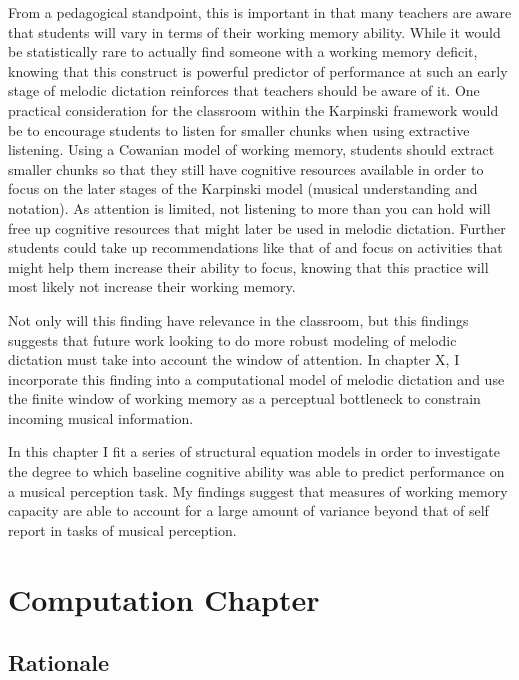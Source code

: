 \documentclass[]{book}
\begin{document}
From a pedagogical standpoint, this is important in that many teachers are aware that students will vary in terms of their working memory ability.
While it would be statistically rare to actually find someone with a working memory deficit, knowing that this construct is powerful predictor of performance at such an early stage of melodic dictation reinforces that teachers should be aware of it.
One practical consideration for the classroom within the Karpinski framework would be to encourage students to listen for smaller chunks when using extractive listening.
Using a Cowanian model of working memory, students should extract smaller chunks so that they still have cognitive resources available in order to focus on the later stages of the Karpinski model (musical understanding and notation).
As attention is limited, not listening to more than you can hold will free up cognitive resources that might later be used in melodic dictation.
Further students could take up recommendations like that of \citet{chenetteReframingAuralSkills2019} and focus on activities that might help them increase their ability to focus, knowing that this practice will most likely not increase their working memory.

Not only will this finding have relevance in the classroom, but this findings suggests that future work looking to do more robust modeling of melodic dictation must take into account the window of attention.
In chapter X, I incorporate this finding into a computational model of melodic dictation and use the finite window of working memory as a perceptual bottleneck to constrain incoming musical information.

In this chapter I fit a series of structural equation models in order to investigate the degree to which baseline cognitive ability was able to predict performance on a musical perception task.
My findings suggest that measures of working memory capacity are able to account for a large amount of variance beyond that of self report in tasks of musical perception.

\hypertarget{computation-chapter}{%
\chapter{Computation Chapter}\label{computation-chapter}}

\hypertarget{rationale-2}{%
\section{Rationale}\label{rationale-2}}
\end{document}
